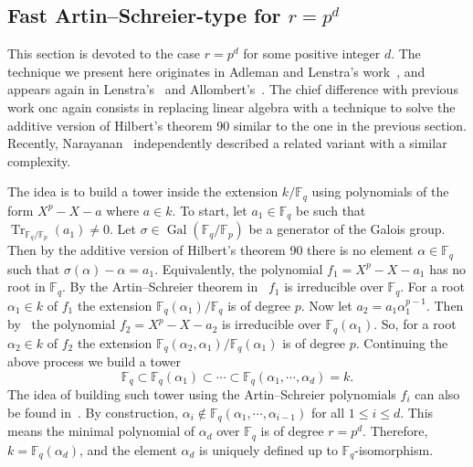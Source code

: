 \documentclass[12pt]{article}
\theoremstyle{plain}
\theoremstyle{definition}
\DeclareMathOperator{\trace}{Tr} %
\DeclareMathOperator{\gal}{Gal} %
\def\F{\ensuremath{\mathbb{F}}}
\begin{document}
\subsection{Fast Artin--Schreier-type for $r=p^d$}
\label{sec:fast-artin-schreier}

This section is devoted to the case $r = p^d$ for some positive integer $d$.
The technique we present here originates in Adleman and Lenstra's work~\cite[Lemma 5]{Adleman-Lenstra},
and appears again in Lenstra's~\cite{LenstraJr91}
and Allombert's~\cite{Allombert02}.
The chief difference with previous work onc again consists
in replacing linear algebra
with a technique to solve the additive version of Hilbert's theorem 90
similar to the one in the previous section.
Recently, Narayanan~\cite[Sec.~4]{narayanan2016fast} independently described
a related variant with a similar complexity.

The idea is to build a 
tower inside the extension $k/\F_q$ using polynomials of the form $X^p - X - a$ where $a \in k$.
To  start, let $a_1 \in \F_q$ be such that $\trace_{\F_q/\F_p}(a_1) \ne 0$.
Let $\sigma \in  \gal(\F_q/\F_p)$ be a generator of the Galois group.
Then by the additive version of  Hilbert's theorem 90 there is no element 
$\alpha \in \F_q$ such that $\sigma(\alpha) - \alpha = a_1$.
Equivalently, the polynomial $f_1 =  X^p - X - a_1$ has no root in $\F_q$.
By the Artin--Schreier theorem in~\cite[Ch VI]{lang} $f_1$ 
is irreducible over $\F_q$. For a root $\alpha_1 \in k$ of $f_1$ the extension $\F_q(\alpha_1) / \F_q$ is of degree $p$.
Now let $a_2 = a_1\alpha_1^{p - 1}$. Then by~\cite[Lemma 5]{Adleman-Lenstra} the polynomial $f_2 = 
X^p - X - a_2$ is irreducible over $\F_q(\alpha_1)$. So, for a root $\alpha_2 \in k$ of $f_2$ the 
extension $\F_q(\alpha_2, \alpha_1) / \F_q(\alpha_1)$ is of degree $p$. Continuing the above 
process we build a tower
\begin{equation}
	\label{equ:art-sch-tower}
	\F_q \subset \F_q(\alpha_1)  \subset \cdots \subset \F_q(\alpha_1, \cdots, \alpha_d) = k.
\end{equation}
The idea of building such tower using the Artin--Schreier polynomials $f_i$ can also be found
in~\cite{LenstraJr91, Allombert02, shoup93}. By construction, $\alpha_i \notin \F_q(\alpha_1, \cdots, 
\alpha_{i - 1})$ for all $1 \le i \le d$. This means the minimal polynomial of $\alpha_d$ over 
$\F_q$ is of degree $r = p^d$. Therefore, $k = \F_q(\alpha_d)$, and the element $\alpha_d$ is 
uniquely defined up to $\F_q$-isomorphism.
\end{document}
